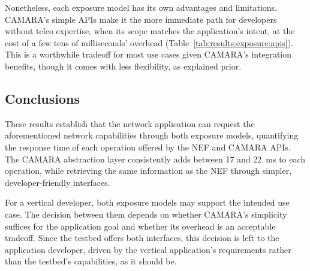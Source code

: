 Nonetheless, each exposure model has its own advantages and limitations. CAMARA's simple \acsp{API} make it the more immediate path for developers without telco expertise, when its scope matches the application's intent, at the cost of a few tens of milliseconds' overhead (Table~\ref{tab:results:exposure:apis}). This is a worthwhile tradeoff for most use cases given CAMARA's integration benefits, though it comes with less flexibility, as explained prior.

\subsection{Conclusions}
\label{chap:results:exposure:conclusion}

These results establish that the network application can request the aforementioned network capabilities through both exposure models, quantifying the response time of each operation offered by the \acs{NEF} and CAMARA \acsp{API}. The CAMARA abstraction layer consistently adds between 17 and 22~ms to each operation, while retrieving the same information as the \acs{NEF} through simpler, developer-friendly interfaces.

For a vertical developer, both exposure models may support the intended use case. The decision between them depends on whether CAMARA's simplicity suffices for the application goal and whether its overhead is an acceptable tradeoff. Since the testbed offers both interfaces, this decision is left to the application developer, driven by the vertical application's requirements rather than the testbed's capabilities, as it should be.

